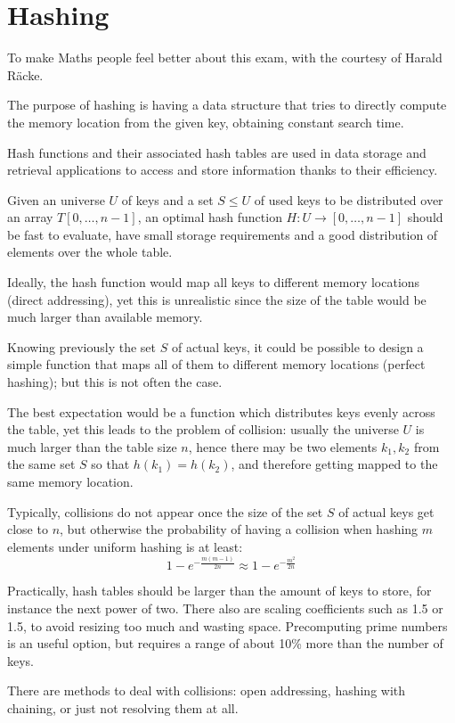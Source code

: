\section{Hashing}
To make Maths people feel better about this exam, with the courtesy of Harald Räcke.

The purpose of hashing is having a data structure that tries to directly compute the memory location from the given key, obtaining constant search time. 

Hash functions and their associated hash tables are used in data storage and retrieval applications to access and store information thanks to their efficiency.

Given an universe $U$ of keys and a set $S \leq U$ of used keys to be distributed over an array $T[0, \dots, n-1]$, an optimal hash function $H : U \rightarrow [0, \dots, n-1]$ should be fast to evaluate, have small storage requirements and a good distribution of elements over the whole table.

Ideally, the hash function would map all keys to different memory locations (direct addressing), yet this is unrealistic since the size of the table would be much larger than available memory.

Knowing previously the set $S$ of actual keys, it could be possible to design a simple function that maps all of them to different memory locations (perfect hashing); but this is not often the case.

The best expectation would be a function which distributes keys evenly across the table, yet this leads to the problem of collision: usually the universe $U$ is much larger than the table size $n$, hence there may be two elements $k_1, k_2$ from the same set $S$ so that $h(k_1) = h(k_2)$, and therefore getting mapped to the same memory location.

Typically, collisions do not appear once the size of the set $S$ of actual keys get close to $n$, but otherwise the probability of having a collision when hashing $m$ elements under uniform hashing is at least:
$$1 - e^{-\frac{m(m-1)}{2n}} \approx 1 - e^{-\frac{m^2}{2n}}$$

Practically, hash tables should be larger than the amount of keys to store, for instance the next power of two. There also are scaling coefficients such as 1.5 or 1.5, to avoid resizing too much and wasting space. Precomputing prime numbers is an useful option, but requires a range of about 10\% more than the number of keys.

There are methods to deal with collisions: open addressing, hashing with chaining, or just not resolving them at all.

